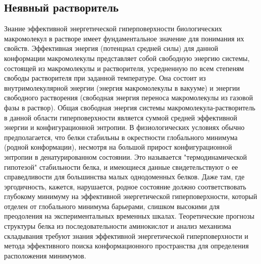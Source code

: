 \subsection{Неявный растворитель}


Знание эффективной энергетической гиперповерхности биологических макромолекул в растворе имеет фундаментальное значение для понимания их свойств. Эффективная энергия (потенциал средней силы) для данной конформации макромолекулы представляет собой свободную энергию системы, состоящей из макромолекулы и растворителя, усредненную по всем степеням свободы растворителя при заданной температуре. Она состоит из внутримолекулярной энергии (энергия макромолекулы в вакууме) и энергии свободного растворения (свободная энергия переноса макромолекулы из газовой фазы в раствор). Общая свободная энергия системы макромолекула-растворитель в данной области гиперповерхности является суммой средней эффективной энергии и конфигурационной энтропии. В физиологических условиях обычно предполагается, что белки стабильны в окрестности глобального минимума (родной конформации), несмотря на большой прирост конфигурационной энтропии в денатурированном состоянии. Это называется "термодинамической гипотезой" стабильности белка, и имеющиеся данные свидетельствуют о ее справедливости для большинства малых однодоменных белков. Даже там, где эргодичность, кажется, нарушается, родное состояние должно соответствовать глубокому минимуму на эффективной энергетической гиперповерхности, который отделен от глобального минимума барьерами, слишком высокими для преодоления на экспериментальных временных шкалах. Теоретические прогнозы структуры белка из последовательности аминокислот и анализ механизма складывания требуют знания эффективной энергетической гиперповерхности и метода эффективного поиска конформационного пространства для определения расположения минимумов.

